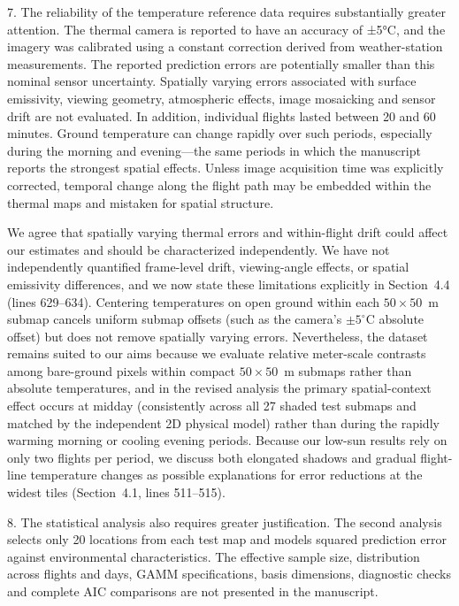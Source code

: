\documentclass[12pt,english]{reviewresponse}
\begin{document}
\begin{revcomment}
7. The reliability of the temperature reference data requires substantially greater attention. The thermal camera is reported to have an accuracy of ±5°C, and the imagery was calibrated using a constant correction derived from weather-station measurements. The reported prediction errors are potentially smaller than this nominal sensor uncertainty. Spatially varying errors associated with surface emissivity, viewing geometry, atmospheric effects, image mosaicking and sensor drift are not evaluated. In addition, individual flights lasted between 20 and 60 minutes. Ground temperature can change rapidly over such periods, especially during the morning and evening—the same periods in which the manuscript reports the strongest spatial effects. Unless image acquisition time was explicitly corrected, temporal change along the flight path may be embedded within the thermal maps and mistaken for spatial structure.
\end{revcomment}

\begin{revresponse}
We agree that spatially varying thermal errors and within-flight drift could affect our estimates and should be characterized independently. We have not independently quantified frame-level drift, viewing-angle effects, or spatial emissivity differences, and we now state these limitations explicitly in Section~4.4 (lines 629--634). Centering temperatures on open ground within each $50\times 50$~m submap cancels uniform submap offsets (such as the camera's $\pm 5^\circ\mathrm{C}$ absolute offset) but does not remove spatially varying errors. Nevertheless, the dataset remains suited to our aims because we evaluate relative meter-scale contrasts among bare-ground pixels within compact $50\times 50$~m submaps rather than absolute temperatures, and in the revised analysis the primary spatial-context effect occurs at midday (consistently across all 27 shaded test submaps and matched by the independent 2D physical model) rather than during the rapidly warming morning or cooling evening periods. Because our low-sun results rely on only two flights per period, we discuss both elongated shadows and gradual flight-line temperature changes as possible explanations for error reductions at the widest tiles (Section~4.1, lines 511--515).
\end{revresponse}

\begin{revcomment}[adjusted title={Comment 8 (Part 1)}]
8. The statistical analysis also requires greater justification. The second analysis selects only 20 locations from each test map and models squared prediction error against environmental characteristics. The effective sample size, distribution across flights and days, GAMM specifications, basis dimensions, diagnostic checks and complete AIC comparisons are not presented in the manuscript.
\end{revcomment}
\end{document}
